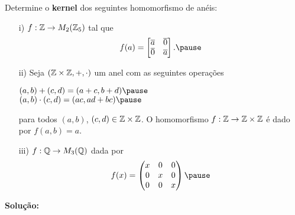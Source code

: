 \documentclass{beamer}
\begin{document}
    \begin{frame}
        \begin{exemplos}
            Determine o \textbf{kernel} dos seguintes homomorfismo de an\'eis:
            \begin{enumerate}
                \item[i)] $f : \mathbb{Z} \to M_2(\mathbb{Z}_5)$ \pause tal que\pause
                \[
                    f(a) = \begin{bmatrix}
                        \overline{a} & \overline{0}\\
                        \overline{0} & \overline{a}
                    \end{bmatrix}.\pause
                \]

                \item[ii)] Seja $(\mathbb{Z}\times\mathbb{Z}, +, \cdot)$ \pause um anel com as seguintes opera\c{c}\~oes\pause
                \begin{center}
                    $(a, b) + (c, d) = (a + c, b + d)\pause$\\
                    $(a, b)\cdot (c, d) = (ac, ad + bc)\pause$
                \end{center}
                para todos $(a, b)$, $(c, d) \in \mathbb{Z}\times\mathbb{Z}$. \pause
                O homomorfismo $ f : \mathbb{Z} \to \mathbb{Z} \times \mathbb{Z}$ \'e dado por $f(a, b) = a$.
            \end{enumerate}
        \end{exemplos}
    \end{frame}

    \begin{frame}
        \begin{exemplos}
            \begin{enumerate}
                \item[iii)] $f : \mathbb{Q} \to M_3(\mathbb{Q})$ \pause dada por\pause
                \[
                    f(x) = \begin{pmatrix}
                        x & 0 & 0\\
                        0 & x & 0\\
                        0 & 0 & x
                    \end{pmatrix}\pause
                \]
            \end{enumerate}
        \end{exemplos}

        \noindent \textbf{Solu\c{c}\~ao:}
        \vspace{3cm}
    \end{frame}
\end{document}
